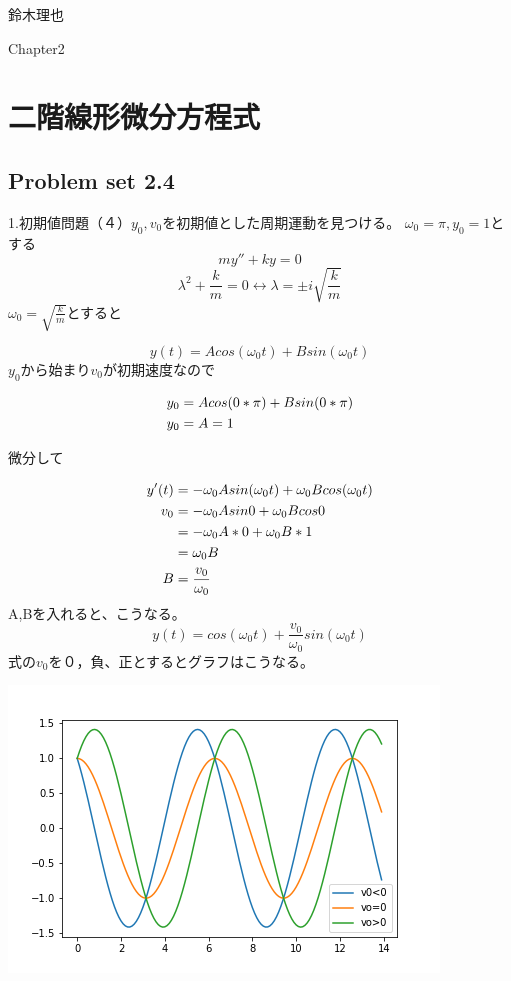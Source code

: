 \documentclass[uplatex]{jsarticle}
\begin{document}
\begin{flushright}
  鈴木理也
\end{flushright}

\setcounter{section}{1}
Chapter2
\section{二階線形微分方程式}

\subsection{Problem set 2.4}
\large
1.初期値問題（４）${y_0},{v_0}$を初期値とした周期運動を見つける。
$  \omega_0=\pi,y_0=1$とする 
  $$ my'' + ky =0$$ 
  $$ {\lambda}^2 +\frac{k}{m} = 0 \leftrightarrow {\lambda} = \pm i {\sqrt{\frac{k}{m}}}$$ 
  ${\omega_0}={\sqrt{\frac{k}{m}}}$とすると

  $$ y(t) = A cos({\omega_0}t) + B sin({\omega_0}t) $$
${y_0}$から始まり${v_0}$が初期速度なので

\begin{align}
  y_0 &= A cos(0 * \pi) + B sin(0* \pi) \notag \\
  y_0 &= A = 1 
\end{align}

微分して

\begin{align}
  y'(t) &= -{\omega_0} A sin({\omega_0}t) + {\omega_0} B cos({\omega_0}t) \notag \\
  v_0 &= -{\omega_0}A sin 0 + {\omega_0}B cos 0 \notag \\
   &= -{\omega_0}A*0 + {\omega_0}B*1 \notag \\
   &= {\omega_0}B \notag \\
  B &= \frac{v_0}{\omega_0} 
\end{align}
A,Bを入れると、こうなる。
$$ y(t) = cos({\omega_0}t) + \frac{v_0}{\omega_0} sin({\omega_0}t) $$
式の$v_0$を０，負、正とするとグラフはこうなる。


\includegraphics{./hertz.png}
\end{document}
